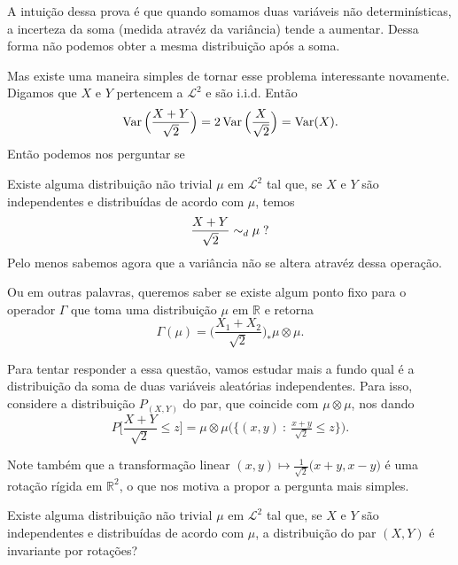 A intuição dessa prova é que quando somamos duas variáveis não determinísticas, a incerteza da soma (medida atravéz da variância) tende a aumentar.
Dessa forma não podemos obter a mesma distribuição após a soma.

Mas existe uma maneira simples de tornar esse problema interessante novamente.
Digamos que $X$ e $Y$ pertencem a $\mathcal{L}^2$ e são i.i.d.
Então
\begin{equation}
  \operatorname{Var}\Big(\frac{X + Y}{\sqrt{2}}\Big) = 2 \operatorname{Var}\Big( \frac X{\sqrt{2}} \Big) = \operatorname{Var}(X).
\end{equation}
Então podemos nos perguntar se

\begin{question}
  \label{q:ponto_fixo_soma}
  Existe alguma distribuição não trivial $\mu$ em $\mathcal{L}^2$ tal que, se $X$ e $Y$ são independentes e distribuídas de acordo com $\mu$, temos
  \begin{equation}
    \frac{X + Y}{\sqrt{2}} \sim_d \mu \; ?
  \end{equation}
  Pelo menos sabemos agora que a variância não se altera atravéz dessa operação.
\end{question}

Ou em outras palavras, queremos saber se existe algum ponto fixo para o operador $\Gamma$ que toma uma distribuição $\mu$ em $\mathbb{R}$ e retorna
\begin{equation}
  \label{e:Gamma_operador}
  \Gamma(\mu) = \Big( \frac{X_1 + X_2}{\sqrt{2}} \Big)_* \mu \otimes \mu.
\end{equation}


Para tentar responder a essa questão, vamos estudar mais a fundo qual é a distribuição da soma de duas variáveis aleatórias independentes.
Para isso, considere a distribuição $P_{(X,Y)}$ do par, que coincide com $\mu \otimes \mu$, nos dando
\begin{equation}
  P\Big[ \frac{X + Y}{\sqrt{2}} \leq z \Big] = \mu \otimes \mu \big( \big\{(x, y) \ : \  \tfrac{x + y}{\sqrt{2}} \leq z \big\} \big).
\end{equation}

Note também que a transformação linear $(x,y) \mapsto \tfrac{1}{\sqrt{2}}\big(x + y, x - y\big)$ é uma rotação rígida em $\mathbb{R}^2$, o que nos motiva a propor a pergunta mais simples.

\begin{question}
  Existe alguma distribuição não trivial $\mu$ em $\mathcal{L}^2$ tal que, se $X$ e $Y$ são independentes e distribuídas de acordo com $\mu$, a distribuição do par $(X,Y)$ é invariante por rotações?
\end{question}

